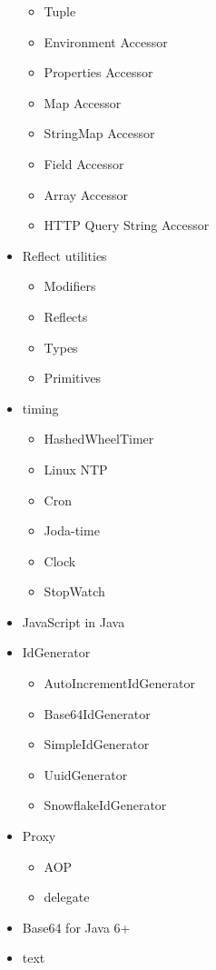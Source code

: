 \documentclass[
]{book}
\providecommand{\tightlist}{%
  \setlength{\itemsep}{0pt}\setlength{\parskip}{0pt}}
\begin{document}
\begin{itemize}
  \begin{itemize}
  \tightlist
  \item
    Tuple
  \item
    Environment Accessor
  \item
    Properties Accessor
  \item
    Map Accessor
  \item
    StringMap Accessor
  \item
    Field Accessor
  \item
    Array Accessor
  \item
    HTTP Query String Accessor
  \end{itemize}
\item
  Reflect utilities

  \begin{itemize}
  \tightlist
  \item
    Modifiers
  \item
    Reflects
  \item
    Types
  \item
    Primitives
  \end{itemize}
\item
  timing

  \begin{itemize}
  \tightlist
  \item
    HashedWheelTimer
  \item
    Linux NTP
  \item
    Cron
  \item
    Joda-time
  \item
    Clock
  \item
    StopWatch
  \end{itemize}
\item
  JavaScript in Java
\item
  IdGenerator

  \begin{itemize}
  \tightlist
  \item
    AutoIncrementIdGenerator
  \item
    Base64IdGenerator
  \item
    SimpleIdGenerator
  \item
    UuidGenerator
  \item
    SnowflakeIdGenerator
  \end{itemize}
\item
  Proxy

  \begin{itemize}
  \tightlist
  \item
    AOP
  \item
    delegate
  \end{itemize}
\item
  Base64 for Java 6+\\
\item
  text


\end{itemize}
\end{document}
